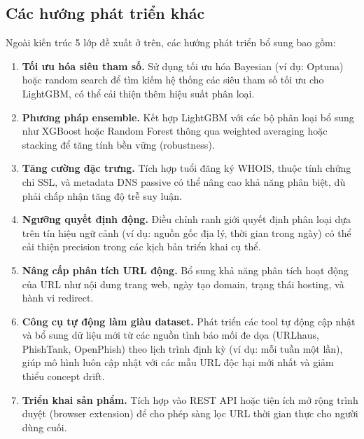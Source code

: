 \documentclass[a4paper,12pt]{article}
\begin{document}
\subsection{Các hướng phát triển khác}

Ngoài kiến trúc 5 lớp đề xuất ở trên, các hướng phát triển bổ sung bao gồm:

\begin{enumerate}
    \item \textbf{Tối ưu hóa siêu tham số.} Sử dụng tối ưu hóa Bayesian (ví dụ: Optuna) hoặc random search để tìm kiếm hệ thống các siêu tham số tối ưu cho LightGBM, có thể cải thiện thêm hiệu suất phân loại.

    \item \textbf{Phương pháp ensemble.} Kết hợp LightGBM với các bộ phân loại bổ sung như XGBoost hoặc Random Forest thông qua weighted averaging hoặc stacking để tăng tính bền vững (robustness).

    \item \textbf{Tăng cường đặc trưng.} Tích hợp tuổi đăng ký WHOIS, thuộc tính chứng chỉ SSL, và metadata DNS passive có thể nâng cao khả năng phân biệt, dù phải chấp nhận tăng độ trễ suy luận.

    \item \textbf{Ngưỡng quyết định động.} Điều chỉnh ranh giới quyết định phân loại dựa trên tín hiệu ngữ cảnh (ví dụ: nguồn gốc địa lý, thời gian trong ngày) có thể cải thiện precision trong các kịch bản triển khai cụ thể.

    \item \textbf{Nâng cấp phân tích URL động.} Bổ sung khả năng phân tích hoạt động của URL như nội dung trang web, ngày tạo domain, trạng thái hosting, và hành vi redirect.

    \item \textbf{Công cụ tự động làm giàu dataset.} Phát triển các tool tự động cập nhật và bổ sung dữ liệu mới từ các nguồn tình báo mối đe dọa (URLhaus, PhishTank, OpenPhish) theo lịch trình định kỳ (ví dụ: mỗi tuần một lần), giúp mô hình luôn cập nhật với các mẫu URL độc hại mới nhất và giảm thiểu concept drift.

    \item \textbf{Triển khai sản phẩm.} Tích hợp vào REST API hoặc tiện ích mở rộng trình duyệt (browser extension) để cho phép sàng lọc URL thời gian thực cho người dùng cuối.
\end{enumerate}
\end{document}
